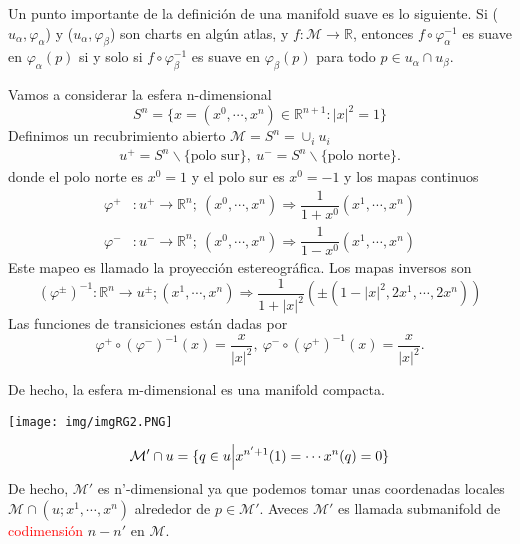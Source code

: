 \documentclass[../main]{subfiles}
\begin{document}
\begin{adjustwidth}{0pt}{-100pt}
Un punto importante de la definición de una manifold suave es lo siguiente. Si ($u_{\alpha}, \varphi_{\alpha}$) y ($u_{\alpha}, \varphi_{\beta}$) son charts en algún atlas, y $f:\mathcal{M}\rightarrow \mathbb{R}$, entonces $f\circ \varphi^{-1}_{\alpha}$ es suave en $\varphi_{\alpha}(p)$ si y solo si $f\circ \varphi^{-1}_{\beta}$ es suave en $\varphi_{\beta}(p)$ para todo $p\in u_{\alpha} \cap u_{\beta}$.

Vamos a considerar la esfera n-dimensional
\begin{equation}
    S^n=\{x=(x^0, \cdots, x^n) \in \mathbb{R}^{n+1}: |x|^2=1\}
\end{equation}
Definimos un recubrimiento abierto $\mathcal{M}=S^n=\cup_i u_i$
\begin{align}
    u^{+}=S^n \backslash \{ \text{polo sur}\}, \ u^{-}=S^n \backslash \{ \text{polo norte}\}.
\end{align}
donde el polo norte es $x^0=1$ y el polo sur es $x^0=-1$ y los mapas continuos
\begin{equation}
    \begin{split}
        \varphi^+&: u^+\rightarrow \mathbb{R}^n; \ (x^0, \cdots, x^n) \Rightarrow \dfrac{1}{1+x^0}(x^1, \cdots, x^n)\\
        \varphi^-&: u^-\rightarrow \mathbb{R}^n; \ (x^0, \cdots, x^n) \Rightarrow \dfrac{1}{1-x^0}(x^1, \cdots, x^n)
    \end{split}
\end{equation}
Este mapeo es llamado la proyección estereográfica. Los mapas inversos son
\begin{equation}
    (\varphi^{\pm})^{-1}: \mathbb{R}^n \rightarrow u^{\pm}; (x^1, \cdots, x^n) \Rightarrow \dfrac{1}{1+|x|^2}(\pm(1-|x|^2, 2x^1, \cdots, 2x^n))
\end{equation}
Las funciones de transiciones están dadas por
\begin{equation}
    \varphi^+ \circ (\varphi^-)^{-1}(x)=\dfrac{x}{|x|^2}, \ \varphi^- \circ (\varphi^+)^{-1}(x)=\dfrac{x}{|x|^2}.
\end{equation}

De hecho, la esfera m-dimensional es una manifold compacta.
\begin{center}
    \texttt{[image: img/imgRG2.PNG]}
\end{center}

\begin{equation}
    \mathcal{M}' \cap u=\{ q\in u \Big{|} x^{n'+1}(1)=\cdots x^n(q)=0\}
\end{equation}
De hecho, $\mathcal{M}'$ es n'-dimensional ya que podemos tomar unas coordenadas locales $\mathcal{M}\cap (u; x^1, \cdots, x^n)$ alrededor de $p\in \mathcal{M}'$. Aveces $\mathcal{M}'$ es llamada submanifold de \textcolor{red}{codimensión} $n-n'$ en $\mathcal{M}$. 


\end{adjustwidth}
\end{document}
